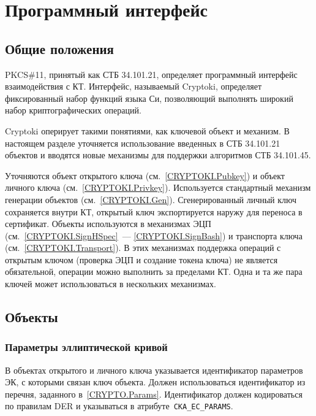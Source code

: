\chapter{Программный интерфейс}\label{CRYPTOKI}

\section{Общие положения}\label{CRYPTOKI.Common}

PKCS\#11, принятый как СТБ 34.101.21, определяет программный
интерфейс взаимодействия с КТ. Интерфейс, называемый Cryptoki, определяет 
фиксированный набор функций языка Си, позволяющий выполнять широкий набор 
криптографических операций. 

Cryptoki оперирует такими понятиями, как ключевой объект и механизм.
%
В настоящем разделе уточняется использование введенных
в СТБ 34.101.21 объектов и вводятся новые механизмы для поддержки
алгоритмов СТБ 34.101.45.

Уточняются объект открытого ключа (см.~\ref{CRYPTOKI.Pubkey}) и объект
личного ключа (см.~\ref{CRYPTOKI.Privkey}). Используется стандартный механизм 
генерации объектов (см.~\ref{CRYPTOKI.Gen}). Сгенерированный личный 
ключ  сохраняется внутри КТ, открытый ключ экспортируется наружу для 
переноса в сертификат. Объекты используются в механизмах ЭЦП 
(см.~\ref{CRYPTOKI.SignHSpec}~--- \ref{CRYPTOKI.SignBash}) и транспорта   
ключа (см.~\ref{CRYPTOKI.Transport}).
%
В этих механизмах поддержка операций с открытым ключом (проверка ЭЦП и 
создание токена ключа) не является обязательной, операции можно выполнить 
за пределами КТ. Одна и та же пара ключей может использоваться в 
нескольких механизмах.

\section{Объекты}\label{CRYPTOKI.Obj}

\subsection{Параметры эллиптической кривой}\label{CRYPTOKI.Params}

В объектах открытого и личного ключа указывается 
идентификатор параметров ЭК, с которыми связан ключ объекта.
%
Должен использоваться идентификатор из перечня, заданного 
в~\ref{CRYPTO.Params}.
%
Идентификатор должен кодироваться по правилам DER и указываться в 
атрибуте~\verb|CKA_EC_PARAMS|.

